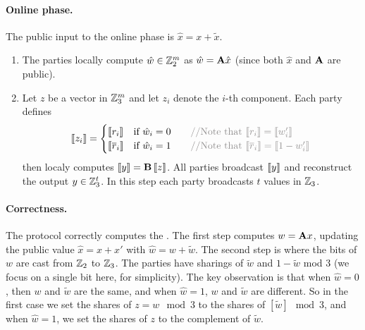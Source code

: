 \paragraph{Online phase.}
The public input to the online phase is $\hat{x} = x + \tilde{x}$. 
\begin{enumerate}

\item The parties locally compute $\hat{w} \in \mathbb{Z}_2^{m}$ as $\hat{w} = \mathbf{A}\hat{x}$ (since both $\hat{x}$ and $\mathbf{A}$ are public). 

\item Let $z$ be a vector in $\mathbb{Z}_3^m$ and let $z_i$ denote the $i$-th component. Each party defines 
\[
    \share{z_i}  = \begin{cases}
                \share{r_i}  & \text{if $\hat{w}_i = 0$} \algcomment{\text{Note that $\share{r_i} = \share{w_i'}$}}\\
                \share{\overline{r}_i}  & \text{if $\hat{w}_i = 1$} \algcomment{\text{Note that $\share{\overline{r}_i} = \share{1- w_i'}$}}\\
            \end{cases}
\]
then localy computes $\left\llbracket y \right\rrbracket = \mathbf{B}\left\llbracket z \right\rrbracket$. All parties broadcast $\left\llbracket y \right\rrbracket$ and reconstruct the output $y\in\mathbb{Z}_{3}^t$. 
In this step each party broadcasts $t$ values in $\mathbb{Z}_3$.
\end{enumerate}

\paragraph{Correctness.} The protocol correctly computes the \ttOWF.  The
first step computes $w = \mathbf{A} x$, 
updating the public value $\hat{x} = x + x'$ with $\hat{w} = w + \tilde{w}$.  The
second step is where the bits of $w$ are cast from $\mathbb{Z}_2$ to $\mathbb{Z}_3$.  The 
parties have sharings of $\tilde{w}$ and $1-\tilde{w}$ mod 3 (we focus on a single bit here, for simplicity). The key observation is
that when $\hat{w} = 0$, then $w$ and $\tilde{w}$ are the same, and when $\hat{w} =
1$, $w$ and $\tilde{w}$ are different. So in the first case we set the shares of $ z =
w \mod 3$ to the shares of $[\tilde{w}] \mod 3$, and when $\hat{w} = 1$, we set the
shares of $z$ to the complement of $\tilde{w}$.

